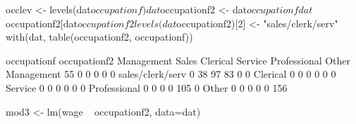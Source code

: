 \begin{Schunk}
\begin{Sinput}
 occlev <- levels(dat$occupationf)
 dat$occupationf2 <- dat$occupationf
 dat$occupationf2[dat$occupationf2 %in% occlev[2:4]] <- occlev[2]
 levels(dat$occupationf2)[2] <- "sales/clerk/serv"
 with(dat, table(occupationf2, occupationf))
\end{Sinput}
\begin{Soutput}
                  occupationf
occupationf2       Management Sales Clerical Service Professional Other
  Management               55     0        0       0            0     0
  sales/clerk/serv          0    38       97      83            0     0
  Clerical                  0     0        0       0            0     0
  Service                   0     0        0       0            0     0
  Professional              0     0        0       0          105     0
  Other                     0     0        0       0            0   156
\end{Soutput}
\begin{Sinput}
 mod3 <- lm(wage ~ occupationf2, data=dat)
\end{Sinput}
\end{Schunk}
